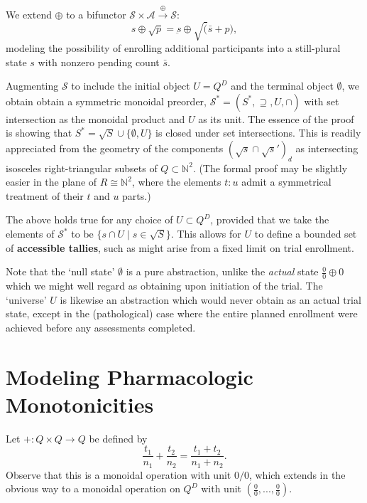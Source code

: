 \documentclass{article}
\newcommand{\N}{\mathbb{N}}
\renewcommand{\S}{\ensuremath{\mathcal{S}}} %
\newcommand{\A}{\ensuremath{\mathcal{A}}}
\begin{document}
\begin{nota}
  We extend $\oplus$ to a bifunctor $\S \times \A \xrightarrow{\oplus} \S$:
  $$
  s \oplus \surd p = \underbar{s} \oplus \surd ( \bar{s} + p ),
  $$
  modeling the possibility of enrolling additional participants into a still-plural state $s$ with nonzero pending count $\bar{s}$.
\end{nota}

\begin{fact}
  Augmenting $\S$ to include the initial object $U = Q^D$ and the terminal object $\emptyset$, we obtain obtain a symmetric monoidal preorder, $\S^* = (S^*,\supseteq,U,\cap)$ with set intersection as the monoidal product and $U$ as its unit.  The essence of the proof is showing that $S^* = \surd S \cup \{\emptyset,U\}$ is closed under set intersections.  This is readily appreciated from the geometry of the components $(\surd s \cap \surd s')_d$ as intersecting isosceles right-triangular subsets of $Q \subset \N^2$.  (The formal proof may be slightly easier in the plane of $R \cong \N^2$, where the elements $t\!:\!u$ admit a symmetrical treatment of their $t$ and $u$ parts.)
\end{fact}

\begin{fact}
  The above holds true for any choice of $U \subset Q^D$, provided that we take the elements of $\S^*$ to be $\{s \cap U \mid s \in \surd S\}$.  This allows for $U$ to define a bounded set of \textbf{accessible tallies}, such as might arise from a fixed limit on trial enrollment.
\end{fact}

Note that the `null state' $\emptyset$ is a pure abstraction, unlike the {\em actual} state $\frac{0}{0} \oplus 0$ which we might well regard as obtaining upon initiation of the trial.  The `universe' $U$ is likewise an abstraction which would never obtain as an actual trial state, except in the (pathological) case where the entire planned enrollment were achieved before any assessments completed.

\section{Modeling Pharmacologic Monotonicities}

\begin{defn}
  Let $+:Q \times Q \rightarrow Q$ be defined by
  $$
  \frac{t_1}{n_1} + \frac{t_2}{n_2} = \frac{t_1 + t_2}{n_1 + n_2}.
  $$
  Observe that this is a monoidal operation with unit $0/0$, which extends in the obvious way to a monoidal operation on $Q^D$ with unit $(\frac{0}{0},...,\frac{0}{0})$.
\end{defn}
\end{document}
